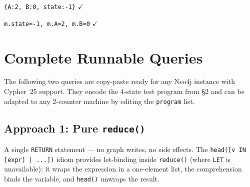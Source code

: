 \documentclass[sigconf, nonacm]{acmart}
\begin{document}
\begin{resultbox}
\texttt{\{A:2, B:0, state:-1\}} \enspace$\checkmark$
\end{resultbox}

\begin{resultbox}
\texttt{m.state=-1, m.A=2, m.B=0} \enspace$\checkmark$
\end{resultbox}

\section{Complete Runnable Queries}

The following two queries are copy-paste ready for any Neo4j instance
with Cypher~25 support. They encode the 4-state test
program from \S2 and can be adapted to any 2-counter machine by
editing the \texttt{program} list.

\subsection{Approach 1: Pure \texttt{reduce()}}

A single \texttt{RETURN} statement --- no graph writes, no side effects.
The \texttt{head([v IN [expr] | ...])} idiom provides let-binding
inside \texttt{reduce()} (where \texttt{LET} is unavailable): it wraps
the expression in a one-element list, the comprehension binds the
variable, and \texttt{head()} unwraps the result.
\end{document}
